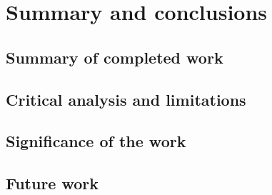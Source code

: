 \clearpage
\section{Summary and conclusions}
\label{sec:conclusions}

\subsection{Summary of completed work}
\label{sec:conclusions-summary}

\subsection{Critical analysis and limitations}
\label{sec:conclusions-limitations}

\subsection{Significance of the work}
\label{sec:conclusions-significance}

\subsection{Future work}
\label{sec:conclusions-future}
